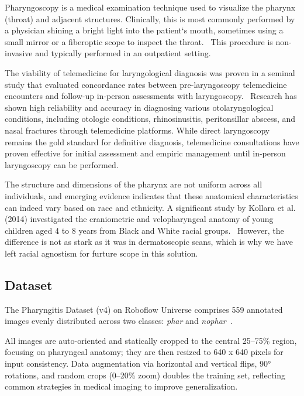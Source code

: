 Pharyngoscopy is a medical examination technique used to visualize the pharynx (throat) and adjacent structures. Clinically, this is most commonly performed by a physician shining a bright light into the patient`s mouth, sometimes using a small mirror or a fiberoptic scope to inspect the throat.~\cite{onto} This procedure is non-invasive and typically performed in an outpatient setting. \par

The viability of telemedicine for laryngological diagnosis was proven in a seminal study that evaluated concordance rates between pre-laryngoscopy telemedicine encounters and follow-up in-person assessments with laryngoscopy.~\cite{choi} Research has shown high reliability and accuracy in diagnosing various otolaryngological conditions, including otologic conditions, rhinosinusitis, peritonsillar abscess, and nasal fractures through telemedicine platforms. While direct laryngoscopy remains the gold standard for definitive diagnosis, telemedicine consultations have proven effective for initial assessment and empiric management until in-person laryngoscopy can be performed. \par

The structure and dimensions of the pharynx are not uniform across all individuals, and emerging evidence indicates that these anatomical characteristics can indeed vary based on race and ethnicity. A significant study by Kollara et al. (2014) investigated the craniometric and velopharyngeal anatomy of young children aged 4 to 8 years from Black and White racial groups.~\cite{kollara} However, the difference is not as stark as it was in dermatoscopic scans, which is why we have left racial agnostism for furture scope in this solution.

\subsection{Dataset}

The Pharyngitis Dataset (v4) on Roboflow Universe comprises 559 annotated images evenly distributed across two classes: \emph{phar} and \emph{nophar}~\cite{robo}.

All images are auto-oriented and statically cropped to the central 25–75\% region, focusing on pharyngeal anatomy; they are then resized to 640 x 640 pixels for input consistency. Data augmentation via horizontal and vertical flips, 90° rotations, and random crops (0–20\% zoom) doubles the training set, reflecting common strategies in medical imaging to improve generalization. \par

